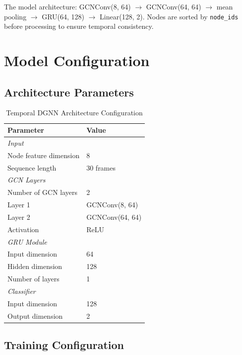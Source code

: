 The model architecture: GCNConv(8, 64) $\rightarrow$ GCNConv(64, 64) $\rightarrow$ mean pooling $\rightarrow$ GRU(64, 128) $\rightarrow$ Linear(128, 2). Nodes are sorted by \texttt{node\_ids} before processing to ensure temporal consistency.

\section{Model Configuration}

\subsection{Architecture Parameters}

\begin{table}[H]
\centering
\caption{Temporal DGNN Architecture Configuration}
\label{tab:temporal_gnn_config}
\begin{tabular}{ll}
\toprule
\textbf{Parameter} & \textbf{Value} \\
\midrule
\multicolumn{2}{l}{\textit{Input}} \\
Node feature dimension & 8 \\
Sequence length & 30 frames \\
\midrule
\multicolumn{2}{l}{\textit{GCN Layers}} \\
Number of GCN layers & 2 \\
Layer 1 & GCNConv(8, 64) \\
Layer 2 & GCNConv(64, 64) \\
Activation & ReLU \\
\midrule
\multicolumn{2}{l}{\textit{GRU Module}} \\
Input dimension & 64 \\
Hidden dimension & 128 \\
Number of layers & 1 \\
\midrule
\multicolumn{2}{l}{\textit{Classifier}} \\
Input dimension & 128 \\
Output dimension & 2 \\
\bottomrule
\end{tabular}
\end{table}

\subsection{Training Configuration}


